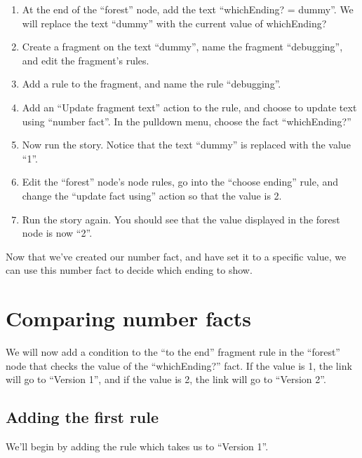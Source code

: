 \documentclass{article}
\begin{document}
\begin{enumerate}
    \item At the end of the ``forest'' node, add the text ``whichEnding? =  dummy''. We will replace the text ``dummy'' with the current value of whichEnding?
    \item Create a fragment on the text ``dummy'', name the fragment ``debugging'', and edit the fragment's rules.
    \item Add a rule to the fragment, and name the rule ``debugging''.
    \item Add an ``Update fragment text'' action to the rule, and choose to update text using ``number fact''. In the pulldown menu, choose the fact ``whichEnding?''
    \item Now run the story. Notice that the text ``dummy'' is replaced with the value ``1''.
    \item Edit the ``forest'' node's node rules, go into the ``choose ending'' rule, and change the ``update fact using'' action so that the value is 2. 
    \item Run the story again. You should see that the value displayed in the forest node is now ``2''.
\end{enumerate}

\noindent Now that we've created our number fact, and have set it to a specific value, we can use this number fact to decide which ending to show.

\section{Comparing number facts}

We will now add a condition to the ``to the end'' fragment rule in the ``forest'' node that checks the value of the ``whichEnding?'' fact. 
If the value is 1, the link will go to ``Version 1'', and if the 
value is 2, the link will go to ``Version 2''.

\subsection{Adding the first rule}

We'll begin by adding the rule which takes us to ``Version 1''.
\end{document}
